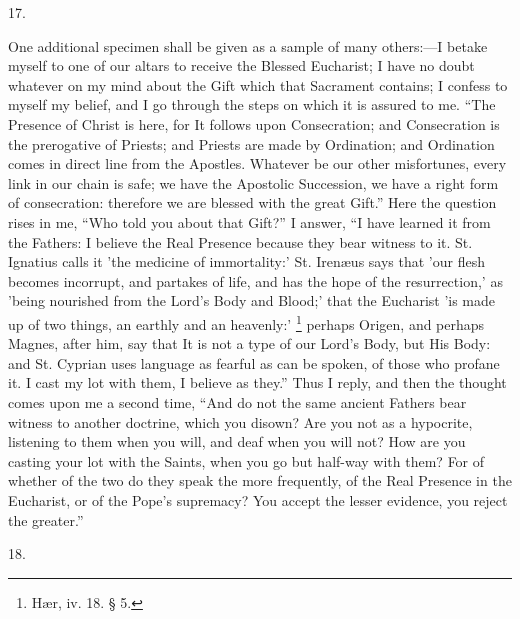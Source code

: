 17.

One additional specimen shall be given as a sample of
many others:—I betake myself to one of our altars to
receive the Blessed Eucharist; I have no doubt whatever
on my mind about the Gift which that Sacrament contains;
I confess to myself my belief, and I go through the steps
on which it is assured to me. ``The Presence of
Christ is here, for It follows upon Consecration; and
Consecration is the prerogative of Priests; and Priests
are made by Ordination; and Ordination comes in direct
line from the Apostles. Whatever be our other
misfortunes, every link in our chain is safe; we have the
Apostolic Succession, we have a right form of
consecration: therefore we are blessed with the great
Gift.'' Here the question rises in me, ``Who told
you about that Gift?'' I answer, ``I have learned
it from the Fathers: I believe the Real Presence because
they bear witness to it. St. Ignatius calls it 'the
medicine of immortality:' St. Irenæus says that 'our
flesh becomes incorrupt, and partakes of life, and has
the hope of the resurrection,' as 'being nourished from
the Lord's Body and Blood;' that the Eucharist 'is made
up of two things, an earthly and an heavenly:' \footnote{Hær, iv. 18. § 5.}
perhaps Origen, and perhaps Magnes, after him, say that
It is not a type of our Lord's Body, but His Body: and
St. Cyprian uses language as fearful as can be spoken, of
those who profane it. I cast my lot with them, I believe
as they.'' Thus I reply, and then the thought comes
upon me a second time, ``And do not the same ancient
Fathers bear witness to another doctrine, which you
disown? Are you not as a hypocrite, listening to them
when you will, and deaf when you will not? How are you
casting your lot with the Saints, when you go but
half-way with them? For of whether of the two do they
speak the more frequently, of the Real Presence in the
Eucharist, or of the Pope's supremacy? You accept the
lesser evidence, you reject the greater.''

18.

